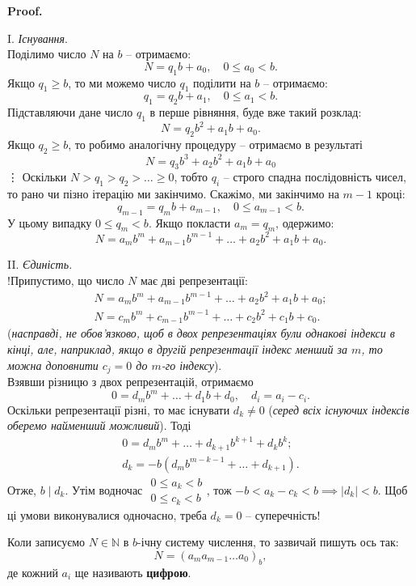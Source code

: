 \documentclass[a4paper, 10pt]{article}
\makeatletter
\theoremstyle{theoremdd}
\theoremstyle{theoremdd}
\theoremstyle{theoremdd}
\theoremstyle{theoremdd}
\theoremstyle{theoremdd}
\theoremstyle{theoremdd}
\theoremstyle{theoremdd}
\theoremstyle{theoremdd}
\renewenvironment{proof}[1][Proof.\\]{\par
\pushQED{\hfill \qed}%
\normalfont \topsep6\p@\@plus6\p@\relax
\trivlist
\item\relax
{\bfseries
#1\@addpunct{.}}\hspace\labelsep\ignorespaces
}{%
\popQED\endtrivlist\@endpefalse
}
\makeatother
\begin{document}
\begin{proof}
I. \textit{Існування}.\\
Поділимо число $N$ на $b$ -- отримаємо:
\[
N = q_1 b + a_0, \quad 0 \leq a_0 < b.
\]
Якщо $q_1 \geq b$, то ми можемо число $q_1$ поділити на $b$ -- отримаємо:\\
\[
q_1 = q_2 b + a_1, \quad 0 \leq a_1 < b.
\]
Підставляючи дане число $q_1$ в перше рівняння, буде вже такий розклад:
\[
N = q_2b^2 + a_1b + a_0.
\]
Якщо $q_2 \geq b$, то робимо аналогічну процедуру -- отримаємо в результаті
\[
N = q_3 b^3 + a_2 b^2 + a_1 b + a_0
\]
\vdots
Оскільки $N > q_1 > q_2 > \dots \geq 0$, тобто $q_i$ -- строго спадна послідовність чисел, то рано чи пізно ітерацію ми закінчимо. Скажімо, ми закінчимо на $m-1$ кроці:
\[
q_{m-1} = q_m b + a_{m-1},\quad 0 \leq a_{m-1} < b.
\]
У цьому випадку $0 \leq q_m < b$. Якщо покласти $a_m = q_m$, одержимо:
\[
N = a_m b^m + a_{m-1} b^{m-1} + \dots + a_2 b^2 + a_1 b + a_0.
\]

II. \textit{Єдиність.}\\
!Припустимо, що число $N$ має дві репрезентації:
\begin{gather*}
N = a_m b^m + a_{m-1} b^{m-1} + \dots + a_2 b^2 + a_1 b + a_0; \\
N = c_m b^m + c_{m-1} b^{m-1} + \dots + c_2 b^2 + c_1 b + c_0.
\end{gather*}
(\textit{насправді, не обов'язково, щоб в двох репрезентаціях були однакові індекси в кінці, але, наприклад, якщо в другій репрезентації індекс менший за $m$, то можна доповнити $c_j = 0$ до $m$-го індексу}).\\
Взявши різницю з двох репрезентацій, отримаємо
\[
0 = d_m b^m + \dots + d_1 b + d_0,\quad d_i = a_i - c_i.
\]
Оскільки репрезентації різні, то має існувати $d_k \neq 0$ (\textit{серед всіх існуючих індексів оберемо найменший можливий}). Тоді
\begin{align*}
0 = d_mb^m + \dots + d_{k+1}b^{k+1} + d_k b^k; \\
d_k = -b(d_m b^{m-k-1} + \dots + d_{k+1}).
\end{align*}
Отже, $b \mid d_k$. Утім водночас $\begin{gathered} 0 \leq a_k < b \\ 0 \leq c_k < b \end{gathered}$, тож $-b < a_k - c_k < b \implies |d_k| < b$. Щоб ці умови виконувалися одночасно, треба $d_k = 0$ -- суперечність!
\end{proof}

Коли записуємо $N \in \mathbb{N}$ в $b$-ічну систему числення, то зазвичай пишуть ось так: 
\[
N = (a_m a_{m-1} \dots a_0)_{b},
\]
де кожний $a_i$ ще називають \textbf{цифрою}.
\end{document}

